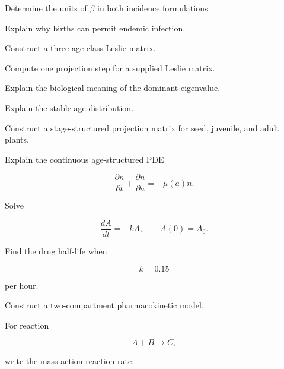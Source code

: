 \begin{exercise}[3]
Determine the units of \(\beta\) in both incidence formulations.
\end{exercise}

\begin{exercise}[3]
Explain why births can permit endemic infection.
\end{exercise}

\begin{exercise}[2]
Construct a three-age-class Leslie matrix.
\end{exercise}

\begin{exercise}[2]
Compute one projection step for a supplied Leslie matrix.
\end{exercise}

\begin{exercise}[3]
Explain the biological meaning of the dominant eigenvalue.
\end{exercise}

\begin{exercise}[3]
Explain the stable age distribution.
\end{exercise}

\begin{exercise}[3]
Construct a stage-structured projection matrix for seed, juvenile, and adult
plants.
\end{exercise}

\begin{exercise}[3]
Explain the continuous age-structured PDE

\[
\frac{\partial n}{\partial t}
+
\frac{\partial n}{\partial a}
=
-\mu(a)n.
\]
\end{exercise}

\begin{exercise}[2]
Solve

\[
\frac{dA}{dt}=-kA,
\qquad
A(0)=A_0.
\]
\end{exercise}

\begin{exercise}[2]
Find the drug half-life when

\[
k=0.15
\]

per hour.
\end{exercise}

\begin{exercise}[3]
Construct a two-compartment pharmacokinetic model.
\end{exercise}

\begin{exercise}[2]
For reaction

\[
A+B\to C,
\]

write the mass-action reaction rate.
\end{exercise}

